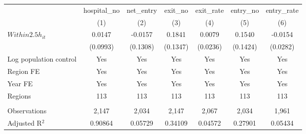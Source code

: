 \begingroup
\centering
\begin{tabular}{lcccccc}
   \toprule
                          & hospital\_no  & net\_entry  & exit\_no  & exit\_rate  & entry\_no  & entry\_rate \\    
                          & (1)           & (2)         & (3)       & (4)         & (5)        & (6)\\  
   \midrule 
   $Within2.5h_{it}$      & 0.0147        & -0.0157     & 0.1841    & 0.0079      & 0.1540     & -0.0154\\   
                          & (0.0993)      & (0.1308)    & (0.1347)  & (0.0236)    & (0.1424)   & (0.0282)\\   
   Log population control & Yes           & Yes         & Yes       & Yes         & Yes        & Yes\\  
   Region FE              & Yes           & Yes         & Yes       & Yes         & Yes        & Yes\\  
   Year FE                & Yes           & Yes         & Yes       & Yes         & Yes        & Yes\\  
   Regions                & 113           & 113         & 113       & 113         & 113        & 113\\  
    \\
   Observations           & 2,147         & 2,034       & 2,147     & 2,067       & 2,034      & 1,961\\  
   Adjusted R$^2$         & 0.90864       & 0.05729     & 0.34109   & 0.04572     & 0.27901    & 0.05434\\  
   \bottomrule
\end{tabular}
\par\endgroup
